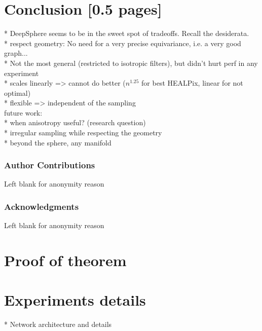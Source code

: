 \documentclass{article} %
\begin{document}
\section{Conclusion [0.5 pages]}

* DeepSphere seems to be in the sweet spot of tradeoffs. Recall the desiderata.\\
  * respect geometry: No need for a very precise equivariance, i.e. a very good graph...\\
  * Not the most general (restricted to isotropic filters), but didn't hurt perf in any experiment\\
  * scales linearly => cannot do better ($n^1.25$ for best HEALPix, linear for not optimal)\\
  * flexible => independent of the sampling\\

future work:\\
* when anisotropy useful? (research question)\\
* irregular sampling while respecting the geometry\\
* beyond the sphere, any manifold\\

\newpage
\subsubsection*{Author Contributions}
Left blank for anonymity reason

\subsubsection*{Acknowledgments}
Left blank for anonymity reason




\newpage

{\LARGE {}}
\appendix

\section{Proof of theorem}


\section{Experiments details}
* Network architecture and details
\end{document}
